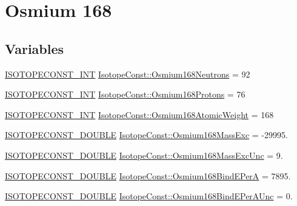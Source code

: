 \hypertarget{group___isotope_const-_osmium-_os168}{}\section{Osmium 168}
\label{group___isotope_const-_osmium-_os168}
\subsection*{Variables}
\begin{DoxyCompactItemize}
\item 
\mbox{\hyperlink{group___isotope_const-_macros_ga5f18360b3e99483a35c32d789e62621c}{I\+S\+O\+T\+O\+P\+E\+C\+O\+N\+S\+T\+\_\+\+I\+NT}} \mbox{\hyperlink{group___isotope_const-_osmium-_os168_ga18f63875dfced24ef5610293be87a85a}{Isotope\+Const\+::\+Osmium168\+Neutrons}} = 92
\item 
\mbox{\hyperlink{group___isotope_const-_macros_ga5f18360b3e99483a35c32d789e62621c}{I\+S\+O\+T\+O\+P\+E\+C\+O\+N\+S\+T\+\_\+\+I\+NT}} \mbox{\hyperlink{group___isotope_const-_osmium-_os168_ga9915b22efa9ec4072cd34fc0b9313969}{Isotope\+Const\+::\+Osmium168\+Protons}} = 76
\item 
\mbox{\hyperlink{group___isotope_const-_macros_ga5f18360b3e99483a35c32d789e62621c}{I\+S\+O\+T\+O\+P\+E\+C\+O\+N\+S\+T\+\_\+\+I\+NT}} \mbox{\hyperlink{group___isotope_const-_osmium-_os168_ga8b419173df9d7c7d0da3ee4995f0025c}{Isotope\+Const\+::\+Osmium168\+Atomic\+Weight}} = 168
\item 
\mbox{\hyperlink{group___isotope_const-_macros_ga8f45a7272ce02c0b4c65c44636ed719a}{I\+S\+O\+T\+O\+P\+E\+C\+O\+N\+S\+T\+\_\+\+D\+O\+U\+B\+LE}} \mbox{\hyperlink{group___isotope_const-_osmium-_os168_ga3a60c611f93bece7b8373acb88f3cb27}{Isotope\+Const\+::\+Osmium168\+Mass\+Exc}} = -\/29995.
\item 
\mbox{\hyperlink{group___isotope_const-_macros_ga8f45a7272ce02c0b4c65c44636ed719a}{I\+S\+O\+T\+O\+P\+E\+C\+O\+N\+S\+T\+\_\+\+D\+O\+U\+B\+LE}} \mbox{\hyperlink{group___isotope_const-_osmium-_os168_gae2f86faf23efa38314379b09e14f1a45}{Isotope\+Const\+::\+Osmium168\+Mass\+Exc\+Unc}} = 9.
\item 
\mbox{\hyperlink{group___isotope_const-_macros_ga8f45a7272ce02c0b4c65c44636ed719a}{I\+S\+O\+T\+O\+P\+E\+C\+O\+N\+S\+T\+\_\+\+D\+O\+U\+B\+LE}} \mbox{\hyperlink{group___isotope_const-_osmium-_os168_ga675224030ebaccce5f0e52aef205e0b3}{Isotope\+Const\+::\+Osmium168\+Bind\+E\+PerA}} = 7895.
\item 
\mbox{\hyperlink{group___isotope_const-_macros_ga8f45a7272ce02c0b4c65c44636ed719a}{I\+S\+O\+T\+O\+P\+E\+C\+O\+N\+S\+T\+\_\+\+D\+O\+U\+B\+LE}} \mbox{\hyperlink{group___isotope_const-_osmium-_os168_gab53ef184e365845ba4ed6d209fe85845}{Isotope\+Const\+::\+Osmium168\+Bind\+E\+Per\+A\+Unc}} = 0.

\end{DoxyCompactItemize}
